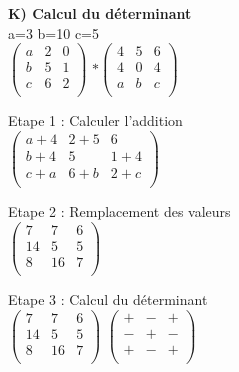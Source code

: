 \newpage

\textbf{K) Calcul du déterminant} \\

a=3 b=10 c=5 \\

$
\begin{pmatrix}
  a & 2 & 0 \\
  b & 5 & 1 \\
  c & 6 & 2 \\
\end{pmatrix}
$
\vspace{5mm} %
$
*
\begin{pmatrix}
  4 & 5 & 6 \\
  4 & 0 & 4 \\
  a & b & c \\
\end{pmatrix}
$
\vspace{5mm} %

Etape 1 :  Calculer l'addition \\

\vspace{3mm} %
$
\begin{pmatrix}
  a+4 & 2+5  & 6  \\
  b+4 & 5    & 1+4 \\
  c+a & 6+b  & 2+c \\
\end{pmatrix}
$

\vspace{5mm} %

Etape 2 : Remplacement des valeurs \\

\vspace{3mm} %
$
\begin{pmatrix}
  7  & 7  & 6 \\
  14 & 5  & 5 \\
  8  & 16 & 7 \\
\end{pmatrix}
$
\vspace{5mm} %

Etape 3 : Calcul du déterminant \\

\vspace{3mm} %
$
\begin{pmatrix}
  7  & 7  & 6 \\
  14 & 5  & 5 \\
  8  & 16 & 7 \\
\end{pmatrix}
$
$
\begin{pmatrix}
  + & - & + \\
  - & + & - \\
  + & - & + \\
\end{pmatrix}
$

